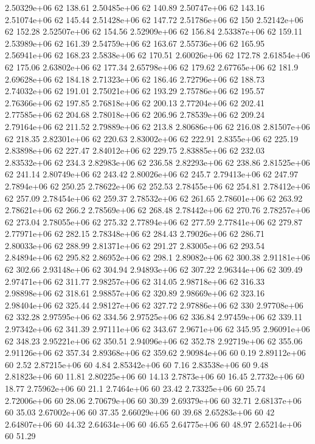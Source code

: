 2.50329e+06 62 138.61
2.50485e+06 62 140.89
2.50747e+06 62 143.16
2.51074e+06 62 145.44
2.51428e+06 62 147.72
2.51786e+06 62 150
2.52142e+06 62 152.28
2.52507e+06 62 154.56
2.52909e+06 62 156.84
2.53387e+06 62 159.11
2.53989e+06 62 161.39
2.54759e+06 62 163.67
2.55736e+06 62 165.95
2.56941e+06 62 168.23
2.5838e+06 62 170.51
2.60026e+06 62 172.78
2.61854e+06 62 175.06
2.63802e+06 62 177.34
2.65798e+06 62 179.62
2.67765e+06 62 181.9
2.69628e+06 62 184.18
2.71323e+06 62 186.46
2.72796e+06 62 188.73
2.74032e+06 62 191.01
2.75021e+06 62 193.29
2.75786e+06 62 195.57
2.76366e+06 62 197.85
2.76818e+06 62 200.13
2.77204e+06 62 202.41
2.77585e+06 62 204.68
2.78018e+06 62 206.96
2.78539e+06 62 209.24
2.79164e+06 62 211.52
2.79889e+06 62 213.8
2.80686e+06 62 216.08
2.81507e+06 62 218.35
2.82301e+06 62 220.63
2.83002e+06 62 222.91
2.8355e+06 62 225.19
2.83898e+06 62 227.47
2.84012e+06 62 229.75
2.83885e+06 62 232.03
2.83532e+06 62 234.3
2.82983e+06 62 236.58
2.82293e+06 62 238.86
2.81525e+06 62 241.14
2.80749e+06 62 243.42
2.80026e+06 62 245.7
2.79413e+06 62 247.97
2.7894e+06 62 250.25
2.78622e+06 62 252.53
2.78455e+06 62 254.81
2.78412e+06 62 257.09
2.78454e+06 62 259.37
2.78532e+06 62 261.65
2.78601e+06 62 263.92
2.78621e+06 62 266.2
2.78569e+06 62 268.48
2.78442e+06 62 270.76
2.78257e+06 62 273.04
2.78055e+06 62 275.32
2.77894e+06 62 277.59
2.77841e+06 62 279.87
2.77971e+06 62 282.15
2.78348e+06 62 284.43
2.79026e+06 62 286.71
2.80033e+06 62 288.99
2.81371e+06 62 291.27
2.83005e+06 62 293.54
2.84894e+06 62 295.82
2.86952e+06 62 298.1
2.89082e+06 62 300.38
2.91181e+06 62 302.66
2.93148e+06 62 304.94
2.94893e+06 62 307.22
2.96344e+06 62 309.49
2.97471e+06 62 311.77
2.98257e+06 62 314.05
2.98718e+06 62 316.33
2.98898e+06 62 318.61
2.98857e+06 62 320.89
2.98669e+06 62 323.16
2.98404e+06 62 325.44
2.98127e+06 62 327.72
2.97886e+06 62 330
2.97708e+06 62 332.28
2.97595e+06 62 334.56
2.97525e+06 62 336.84
2.97459e+06 62 339.11
2.97342e+06 62 341.39
2.97111e+06 62 343.67
2.9671e+06 62 345.95
2.96091e+06 62 348.23
2.95221e+06 62 350.51
2.94096e+06 62 352.78
2.92719e+06 62 355.06
2.91126e+06 62 357.34
2.89368e+06 62 359.62
2.90984e+06 60 0.19
2.89112e+06 60 2.52
2.87215e+06 60 4.84
2.85342e+06 60 7.16
2.83538e+06 60 9.48
2.81823e+06 60 11.81
2.80225e+06 60 14.13
2.7873e+06 60 16.45
2.7732e+06 60 18.77
2.75962e+06 60 21.1
2.7464e+06 60 23.42
2.73325e+06 60 25.74
2.72006e+06 60 28.06
2.70679e+06 60 30.39
2.69379e+06 60 32.71
2.68137e+06 60 35.03
2.67002e+06 60 37.35
2.66029e+06 60 39.68
2.65283e+06 60 42
2.64807e+06 60 44.32
2.64634e+06 60 46.65
2.64775e+06 60 48.97
2.65214e+06 60 51.29
